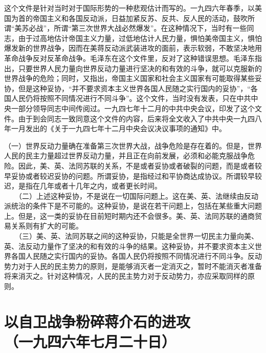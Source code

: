 \documentclass[cn,11pt,chinese]{elegantbook}
\def\myformat#1{\hfil\hfil #1}
\begin{document}
\begin{introduction}\item  这个文件是针对当时对于国际形势的一种悲观估计而写的。一九四六年春季，以美国为首的帝国主义和各国反动派，日益加紧反苏、反共、反人民的活动，鼓吹所谓“美苏必战”，所谓“第三次世界大战必然爆发”。在这种情况下，当时有一些同志，由于过高地估计帝国主义力量，过低地估计人民力量，惧怕美帝国主义，惧怕爆发新的世界战争，因而在美蒋反动派武装进攻的面前，表示软弱，不敢坚决地用革命战争反对反革命战争。毛泽东在这个文件里，反对了这种错误思想。毛泽东指出，只要世界人民力量向世界反动力量进行坚决的和有效的斗争，就可以克服新的世界战争的危险；同时，又指出，帝国主义国家和社会主义国家有可能取得某些妥协，但是这种妥协，“并不要求资本主义世界各国人民随之实行国内的妥协”，“各国人民仍将按照不同情况进行不同斗争”。这个文件，当时没有发表，只在中共中央一部分领导同志中间传阅过。一九四七年十二月的中共中央会议，印发了这个文件。由于到会同志一致同意这个文件的内容，后来将全文收入了中共中央一九四八年一月发出的《关于一九四七年十二月中央会议决议事项的通知》中。\end{introduction}
（一）世界反动力量确在准备第三次世界大战，战争危险是存在着的。但是，世界人民的民主力量超过世界反动力量，并且正在向前发展，必须和必能克服战争危险。因此，美、英、法同苏联的关系，不是或者妥协或者破裂的问题，而是或者较早妥协或者较迟妥协的问题。所谓妥协，是指经过和平协商达成协议。所谓较早较迟，是指在几年或者十几年之内，或者更长时间。\\
　　（二）上述这种妥协，不是说在一切国际问题上。这在美、英、法继续由反动派统治的条件下是不可能的。这种妥协，是说在若干问题上，包括在某些重大问题上。但是，这一类的妥协在目前短时期内还不会很多。美、英、法同苏联的通商贸易关系则有扩大的可能。\\
　　（三）美、英、法同苏联之间的这种妥协，只能是全世界一切民主力量向美、英、法反动力量作了坚决的和有效的斗争的结果。这种妥协，并不要求资本主义世界各国人民随之实行国内的妥协。各国人民仍将按照不同情况进行不同斗争。反动势力对于人民的民主势力的原则，是能够消灭者一定消灭之，暂时不能消灭者准备将来消灭之。针对这种情况，人民的民主势力对于反动势力，亦应采取同样的原则。\\
\newpage\section*{\myformat{以自卫战争粉碎蒋介石的进攻}\\\myformat{（一九四六年七月二十日）}}
\end{document}
